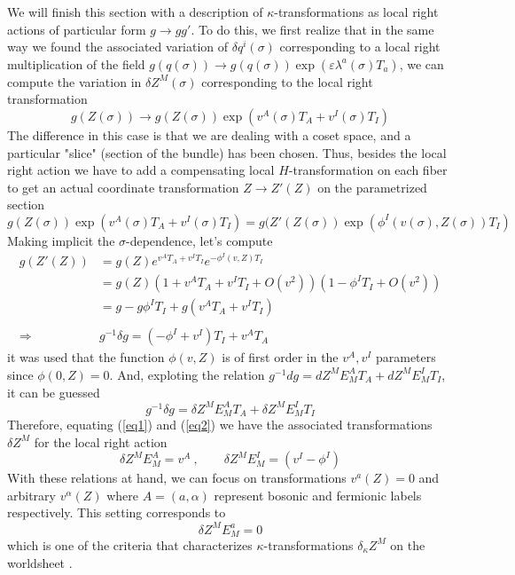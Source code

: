 \documentclass[a4paper,12pt]{article}
\numberwithin{equation}{section}
\numberwithin{thm}{section}
\numberwithin{exm}{section}
\newcommand{\lra}{\longrightarrow}
\newcommand{\mo}{^{-1}}
\newcommand{\<}{{\langle}}
\renewcommand{\>}{{\rangle}}
\renewcommand{\a}{{\alpha}}
\renewcommand{\d}{{\delta}}
\newcommand{\ve}{{\varepsilon}}
\renewcommand{\k}{{\kappa}}
\renewcommand{\l}{{\lambda}}
\newcommand{\s}{{\sigma}}
\begin{document}
We will finish this section with a description of $\k$-transformations as local right actions \cite{McArthur2000} of particular form $g\rightarrow g g'$. To do this, we first realize that in the same way we found the associated variation of $\d q^i(\s)$ corresponding to a local right multiplication of the field $g(q(\s)) \rightarrow g(q(\s))\exp(\ve\l^a(\s) T_a)$, we can compute the variation in $\d Z^M(\s)$ corresponding to the local right transformation
	\begin{equation}
	g(Z(\s)) \lra g(Z(\s))\exp\left(v^A(\s) T_A + v^I(\s) T_I\right)
	\end{equation}
The difference in this case is that we are dealing with a coset space, and a particular "slice" (section of the bundle) has been chosen. Thus, besides the local right action we have to add a compensating local $H$-transformation on each fiber to get an actual coordinate transformation $Z \rightarrow Z'(Z)$ on the parametrized section
	\begin{equation}
	g(Z(\s)) \exp\left(v^A(\s) T_A + v^I(\s) T_I\right) = g(Z'(Z(\s)) \exp\left(\phi^I(v(\s),Z(\s)) T_I\right)
	\end{equation}
Making implicit the $\s$-dependence, let's compute
	\begin{align}
	g(Z'(Z)) & = g(Z) e^{v^A T_A + v^I T_I} e^{-\phi^I(v,Z) T_I} \nonumber \\
	& = g(Z) (1 + v^A T_A + v^I T_I + O(v^2) ) (1 - \phi^I T_I + O(v^2) ) \nonumber \\
	& = g - g\phi^I T_I + g(v^A T_A + v^I T_I) \\
	& \nonumber \\
	\Rightarrow & g\mo \d g = (-\phi^I + v^I) T_I + v^A T_A\label{eq1}
	\end{align} 
it was used that the function $\phi(v,Z)$ is of first order in the $v^A, v^I$ parameters since $\phi(0,Z) = 0$. And, exploting the relation $g\mo d g = dZ^M E^A_M T_A + dZ^M E^I_M T_I$, it can be guessed
	\begin{equation}\label{eq2}
	g\mo \d g = \d Z^M E^A_M T_A + \d Z^M E^I_M T_I
	\end{equation}
Therefore, equating (\ref{eq1}) and (\ref{eq2}) we have the associated transformations $\d Z^M$ for the local right action
	\begin{equation}
	\d Z^M E^A_M = v^A\ ,\qquad \d Z^M E^I_M = (v^I - \phi^I)
	\end{equation}
With these relations at hand, we can focus on transformations $v^a(Z)= 0$ and arbitrary $v^\a(Z)$ where $A=(a,\a)$ represent bosonic and fermionic labels respectively. This setting corresponds to
	\begin{equation}
	\d Z^M E^a_M = 0
	\end{equation}
which is one of the criteria that characterizes $\k$-transformations $\d_\k Z^M$ on the worldsheet \cite{Witten1986,Grisaru1985a}.
\end{document}
